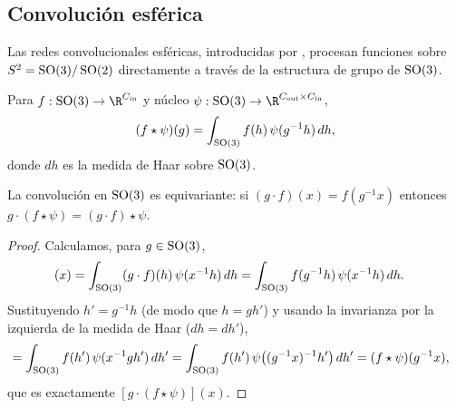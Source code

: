 \subsection{Convoluci\'on esf\'erica}
\label{sec:groups:spherical-convolution}

Las redes convolucionales esf\'ericas, introducidas por
\citet{cohen2018sphericalcnns}, procesan funciones sobre $S^2 = \operatorname{SO}(3)/\operatorname{SO}(2)$
directamente a trav\'es de la estructura de grupo de $\SO(3)$.

\begin{definition}[Convoluci\'on en $\SO(3)$]
\label{def:groups:so3-convolution}
Para $f: \SO(3) \to \R^{C_{\text{in}}}$ y n\'ucleo $\psi: \SO(3) \to
\R^{C_{\text{out}} \times C_{\text{in}}}$,
\begin{equation}
  (f \star \psi)(g) = \int_{\operatorname{SO}(3)} f(h)\, \psi(g^{-1} h)\, dh,
\end{equation}
donde $dh$ es la medida de Haar sobre $\SO(3)$.
\end{definition}

\begin{theorem}
\label{thm:groups:spherical-conv-equivariance}
La convoluci\'on en $\SO(3)$ es equivariante: si $(g \cdot f)(x) = f(g^{-1} x)$
entonces $g \cdot (f \star \psi) = (g \cdot f) \star \psi$.
\end{theorem}

\begin{proof}
Calculamos, para $g \in \operatorname{SO}(3)$,
\begin{align}
  [(g \cdot f) \star \psi](x)
  &= \int_{\SO(3)} (g \cdot f)(h)\, \psi(x^{-1} h)\, dh
   = \int_{\SO(3)} f(g^{-1} h)\, \psi(x^{-1} h)\, dh.
\end{align}
Sustituyendo $h' = g^{-1} h$ (de modo que $h = g h'$) y usando la invarianza por
la izquierda de la medida de Haar ($dh = dh'$),
\begin{align}
  &= \int_{\operatorname{SO}(3)} f(h')\, \psi(x^{-1} g h')\, dh'
   = \int_{\operatorname{SO}(3)} f(h')\, \psi\big((g^{-1} x)^{-1} h'\big)\, dh'
   = (f \star \psi)(g^{-1} x),
\end{align}
que es exactamente $[g \cdot (f \star \psi)](x)$.
\end{proof}

